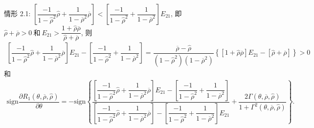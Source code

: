 \documentclass[10.0pt]{article}
\begin{document}
情形 2.1: {\footnotesize $ \left[ \dfrac{- 1}{1 - {\hat \rho}^2} {\hat \rho} + \dfrac1{1 - \overline{\rho}^2} \overline{\rho} \right] < \left[ \dfrac{- 1}{1 - {\hat \rho}^2} + \dfrac1{1 - \overline{\rho}^2} \right] E_{2 1} $}, 即 {\footnotesize $ {\hat \rho} + \overline{\rho} > 0 \ \text{和} \ E_{2 1} > \dfrac{1 + {\hat \rho} \overline{\rho}}{{\hat \rho} + \overline{\rho}} $}, 则
{\footnotesize \begin{eqnarray*}
\left[ \dfrac{- 1}{1 - {\hat \rho}^2} {\hat \rho} + \dfrac1{1 - \overline{\rho}^2} \overline{\rho} \right] E_{2 1} - \left[ \dfrac{- 1}{1 - {\hat \rho}^2} + \dfrac1{1 - \overline{\rho}^2} \right] = \dfrac{\overline{\rho} - {\hat \rho}}{(1 - {\hat \rho}^2) (1 - \overline{\rho}^2)} \left\{ \left[ 1 + {\hat \rho} \overline{\rho} \right] E_{2 1} - \left[ {\hat \rho} + \overline{\rho} \right] \right\} > 0
\end{eqnarray*}}
和
{\footnotesize \begin{eqnarray*}
\text{sign} \dfrac{\partial R_1 (\theta, \overline{\rho}, {\hat \rho})}{\partial \theta} = - \text{sign} \left\{ \dfrac{\left[ \dfrac{- 1}{1 - {\hat \rho}^2} {\hat \rho} + \dfrac1{1 - \overline{\rho}^2} \overline{\rho} \right] E_{2 1} - \left[ \dfrac{- 1}{1 - {\hat \rho}^2} + \dfrac1{1 - \overline{\rho}^2} \right]}{\left[ \dfrac{- 1}{1 - {\hat \rho}^2} {\hat \rho} + \dfrac1{1 - \overline{\rho}^2} \overline{\rho} \right] - \left[ \dfrac{- 1}{1 - {\hat \rho}^2} + \dfrac1{1 - \overline{\rho}^2} \right] E_{2 1}} + \dfrac{2 \Gamma (\theta, \overline{\rho}, {\hat \rho})}{1 + \Gamma^2 (\theta, \overline{\rho}, {\hat \rho})} \right\}.
\end{eqnarray*}}
\end{document}
